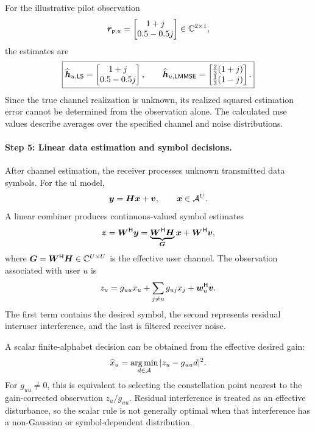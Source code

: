 For the illustrative pilot observation
\begin{equation*}
	\bm{r}_{\mathsf p,u}
	=\begin{bmatrix}1+j\\0.5-0.5j\end{bmatrix}
	\in\mathbb{C}^{2\times1},
\end{equation*}
the estimates are
\begin{equation}
	\boxed{
		\widehat{\bm{h}}_{u,\mathsf{LS}}
		=\begin{bmatrix}1+j\\0.5-0.5j\end{bmatrix},
		\qquad
		\widehat{\bm{h}}_{u,\mathsf{LMMSE}}
		=\begin{bmatrix}\frac23(1+j)\\\frac13(1-j)\end{bmatrix}.
	}
	\label{eq06:pilot-example}
\end{equation}
Since the true channel realization is unknown, its realized squared estimation error cannot be determined from the observation alone. The calculated \ac{mse} values describe averages over the specified channel and noise distributions.

\paragraph{Step 5: Linear data estimation and symbol decisions.}
After channel estimation, the receiver processes unknown transmitted data symbols. For the \ac{ul} model,
\begin{equation*}
	\bm{y}=\bm{H}\bm{x}+\bm{v},
	\qquad
	\bm{x}\in\mathcal{A}^U.
\end{equation*}
A linear combiner produces continuous-valued symbol estimates
\begin{equation*}
	\bm{z}={\bm{W}}^{\mathsf{H}}\bm{y}
	=\underbrace{{\bm{W}}^{\mathsf{H}}\bm{H}}_{\bm{G}}\bm{x}+{\bm{W}}^{\mathsf{H}}\bm{v},
\end{equation*}
where $\bm{G}={\bm{W}}^{\mathsf{H}}\bm{H}\in\mathbb{C}^{U\times U}$ is the effective user channel. The observation associated with user $u$ is
\begin{equation}
	z_u=g_{uu}x_u+\sum_{j\ne u}g_{uj}x_j+{\bm{w}}^{\mathsf{H}}_u\bm{v}.
	\label{eq06:detector-output}
\end{equation}
The first term contains the desired symbol, the second represents residual interuser interference, and the last is filtered receiver noise.

A scalar finite-alphabet decision can be obtained from the effective desired gain:
\begin{equation}
	\widehat x_u
	=\operatorname*{arg\,min}_{d\in\mathcal{A}}|z_u-g_{uu}d|^2.
	\label{eq06:scalar-decision}
\end{equation}
For $g_{uu}\ne0$, this is equivalent to selecting the constellation point nearest to the gain-corrected observation $z_u/g_{uu}$. Residual interference is treated as an effective disturbance, so the scalar rule is not generally optimal when that interference has a non-Gaussian or symbol-dependent distribution.

